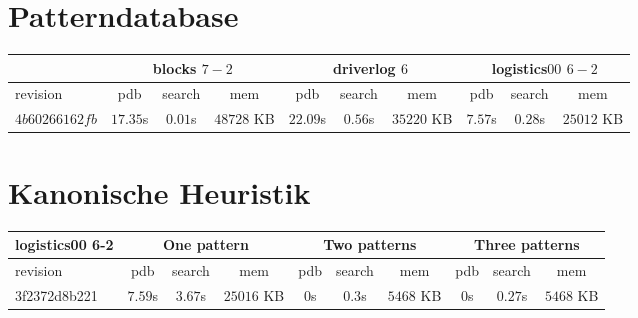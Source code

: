 \documentclass[a4paper,12pt]{scrartcl}
\begin{document}
\section{Patterndatabase}

\begin{tabular}{|l|c|c|c|c|c|c|c|c|c|}\hline
& \multicolumn{3}{c|}{blocks $7-2$} & \multicolumn{3}{c|}{driverlog $6$} & \multicolumn{3}{c|}{logistics$00$ $6-2$}\\\hline
revision & pdb & search & mem & pdb & search & mem & pdb & search & mem\\\hline
$4b60266162fb$ & $17.35$s & $0.01$s & $48728$ KB & $22.09$s & $0.56$s & $35220$ KB & $7.57$s & $0.28$s & $25012$ KB\\\hline
\end{tabular}

\section{Kanonische Heuristik}

\begin{tabular}{|l|c|c|c|c|c|c|c|c|c|}\hline
logistics00 6-2 & \multicolumn{3}{c|}{One pattern} & \multicolumn{3}{c|}{Two patterns} & \multicolumn{3}{c|}{Three patterns}\\\hline
revision & pdb & search & mem & pdb & search & mem & pdb & search & mem\\\hline
3f2372d8b221 & $7.59$s & $3.67$s & $25016$ KB & $0$s & $0.3$s & $5468$ KB & $0$s & $0.27$s & $5468$ KB\\\hline
\end{tabular}
\end{document}
